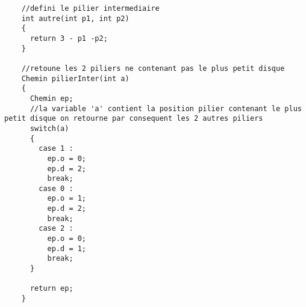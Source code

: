 \begin{verbatim}
    //defini le pilier intermediaire
    int autre(int p1, int p2)
    {
      return 3 - p1 -p2;
    }
    
    //retoune les 2 piliers ne contenant pas le plus petit disque
    Chemin pilierInter(int a)
    {
      Chemin ep;
      //la variable 'a' contient la position pilier contenant le plus petit disque on retourne par consequent les 2 autres piliers
      switch(a)
      {
        case 1 :
          ep.o = 0;
          ep.d = 2;
          break;
        case 0 :
          ep.o = 1;
          ep.d = 2;
          break;
        case 2 :
          ep.o = 0;
          ep.d = 1;
          break;
      }
    
      return ep;
    }
\end{verbatim}